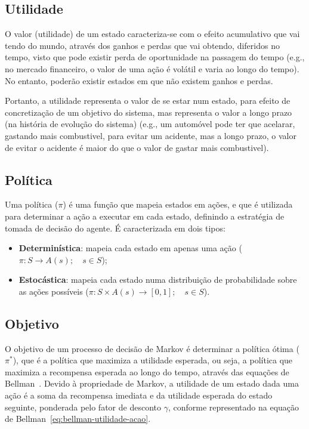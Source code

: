 \subsection{Utilidade}\label{subsec:utilidade}

O valor (utilidade) de um estado caracteriza-se com o efeito acumulativo que vai tendo do mundo, através dos ganhos e perdas que vai obtendo, diferidos no tempo, visto que pode existir perda de oportunidade na passagem do tempo (e.g., no mercado financeiro, o valor de uma ação é volátil e varia ao longo do tempo).
No entanto, poderão existir estados em que não existem ganhos e perdas.

Portanto, a utilidade representa o valor de se estar num estado, para efeito de concretização de um objetivo do sistema, mas representa o valor a longo prazo (na história de evolução do sistema) (e.g., um automóvel pode ter que acelarar, gastando mais combustivel, para evitar um acidente, mas a longo prazo, o valor de evitar o acidente é maior do que o valor de gastar mais combustivel).

\subsection{Política}\label{subsec:politica-otima}

Uma política ($\pi$) é uma função que mapeia estados em ações, e que é utilizada para determinar a ação a executar em cada estado, definindo a estratégia de tomada de decisão do agente.
É caracterizada em dois tipos:

\begin{itemize}
    \item \textbf{Determinística}: mapeia cada estado em apenas uma ação ($\pi : S \rightarrow A(s); \quad s \in S$);
    \item \textbf{Estocástica}: mapeia cada estado numa distribuição de probabilidade sobre as ações possíveis ($\pi : S \times A(s) \rightarrow [0,1]; \quad s \in S$).
\end{itemize}

\subsection{Objetivo}\label{subsec:objetivo}

O objetivo de um processo de decisão de Markov é determinar a política ótima ($\pi^*$), que é a política que maximiza a utilidade esperada, ou seja, a política que maximiza a recompensa esperada ao longo do tempo, através das equações de Bellman~\cite{wiki:bellman-equation}.
Devido à propriedade de Markov, a utilidade de um estado dada uma ação é a soma da recompensa imediata e da utilidade esperada do estado seguinte, ponderada pelo fator de desconto $\gamma$, conforme representado na equação de Bellman~\ref{eq:bellman-utilidade-acao}.

